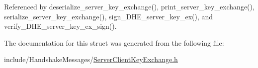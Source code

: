 Referenced by deserialize\+\_\+server\+\_\+key\+\_\+exchange(), print\+\_\+server\+\_\+key\+\_\+exchange(), serialize\+\_\+server\+\_\+key\+\_\+exchange(), sign\+\_\+\+D\+H\+E\+\_\+server\+\_\+key\+\_\+ex(), and verify\+\_\+\+D\+H\+E\+\_\+server\+\_\+key\+\_\+ex\+\_\+sign().



The documentation for this struct was generated from the following file\+:\begin{DoxyCompactItemize}
\item 
include/\+Handshake\+Messages/\hyperlink{_server_client_key_exchange_8h}{Server\+Client\+Key\+Exchange.\+h}\end{DoxyCompactItemize}
